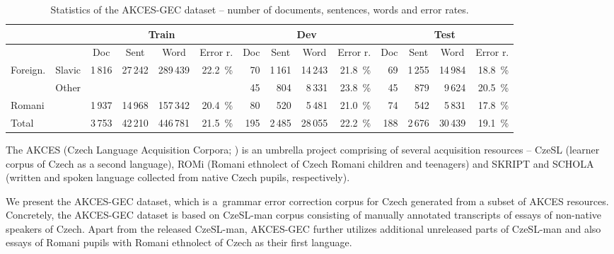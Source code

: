 \documentclass[11pt,a4paper]{article}
\begin{document}
\begin{table*}[t]
    \centering
    \setlength{\tabcolsep}{2.1pt}
    \renewcommand{\arraystretch}{1.1}
    \begin{tabular}{ll||r|r|r|r||r|r|r|r||r|r|r|r}
    & & \multicolumn{4}{c||}{Train} & \multicolumn{4}{c||}{Dev} & \multicolumn{4}{c}{Test} \\\hline
    & & \multicolumn{1}{c|}{Doc} & \multicolumn{1}{c|}{Sent} & \multicolumn{1}{c|}{Word} & \multicolumn{1}{c||}{Error r.} & \multicolumn{1}{c|}{Doc} & \multicolumn{1}{c|}{Sent} & \multicolumn{1}{c|}{Word} & \multicolumn{1}{c||}{Error r.} & \multicolumn{1}{c|}{Doc} & \multicolumn{1}{c|}{Sent} & \multicolumn{1}{c|}{Word} & \multicolumn{1}{c}{Error r.} \\\hline\hline  
    \multirow{2}{*}{Foreign.} & Slavic     & \multirow{2}{*}{1\,816} & \multirow{2}{*}{27\,242} &     \multirow{2}{*}{289\,439} & \multirow{2}{*}{22.2~\%} &
      70 & 1\,161 & 14\,243 & 21.8~\% & 69 & 1\,255 & 14\,984 & 18.8~\% \\\cline{2-2}\cline{7-14}
                                & Other & & & & &
      45 &    804 &  8\,331 & 23.8~\% & 45 &    879 &  9\,624 & 20.5~\% \\\hline
    \multicolumn{2}{l||}{Romani}              & 1\,937 & 14\,968 & 157\,342 & 20.4~\% &
      80 &  520 &    5\,481 & 21.0~\% & 74 &    542 &  5\,831 & 17.8~\% \\\hline\hline
    \multicolumn{2}{l||}{Total}               & 3\,753 & 42\,210 & 446\,781 & 21.5~\% &
     195 & 2\,485 & 28\,055 & 22.2~\% & 188 & 2\,676 & 30\,439 & 19.1~\% \\
    \end{tabular}
    \caption{Statistics of the AKCES-GEC dataset -- number of documents, sentences, words and error rates.}
    \label{tab:akcesgec_sizes}
\end{table*}


The AKCES (Czech Language Acquisition Corpora; \citealp{sebesta2010}) is an umbrella project comprising of several acquisition resources -- CzeSL (learner corpus of Czech as a second language), ROMi (Romani ethnolect of Czech Romani children and teenagers) and SKRIPT and SCHOLA (written and spoken language collected from native Czech pupils, respectively).

We present the AKCES-GEC dataset, which is a~grammar error correction corpus for Czech generated from a subset of AKCES resources. Concretely, the AKCES-GEC dataset is based on CzeSL-man corpus \cite{Rosen:2016a} consisting of manually annotated transcripts of essays of non-native speakers of Czech. Apart from the released CzeSL-man, AKCES-GEC further utilizes additional unreleased parts of CzeSL-man and also essays of Romani pupils with Romani ethnolect of Czech as their first language.
\end{document}
